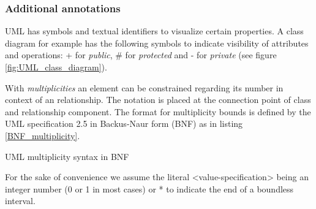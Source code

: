 \documentclass[twoside, openright, 12pt]{book}
\begin{document}
\subsubsection{Additional annotations}
UML has symbols and textual identifiers to visualize certain properties.
A class diagram for example has the following symbols to indicate visibility of attributes and operations: + for \textit{public}, \# for \textit{protected} and - for \textit{private} (see figure \ref{fig:UML_class_diagram}).


\noindent 
With \textit{multiplicities} an element can be constrained regarding its number in context of an relationship.
The notation is placed at the connection point of class and relationship component.
The format for multiplicity bounds is defined by the UML specification 2.5 \citep{UML_OMG} in Backus-Naur form (BNF) as in listing \ref{BNF_multiplicity}.

\setlength{\grammarparsep}{10pt plus 1pt minus 1pt} %
\setlength{\grammarindent}{13em} %

\vspace{0.4cm}
\noindent
\begin{BNF}
\caption{UML multiplicity syntax in BNF}
\label{BNF_multiplicity}
\end{BNF}
\vspace{0.3cm}

\noindent
For the sake of convenience we assume the literal <value-specification> being an integer number (0 or 1 in most cases) or * to indicate the end of a boundless interval.
\end{document}
